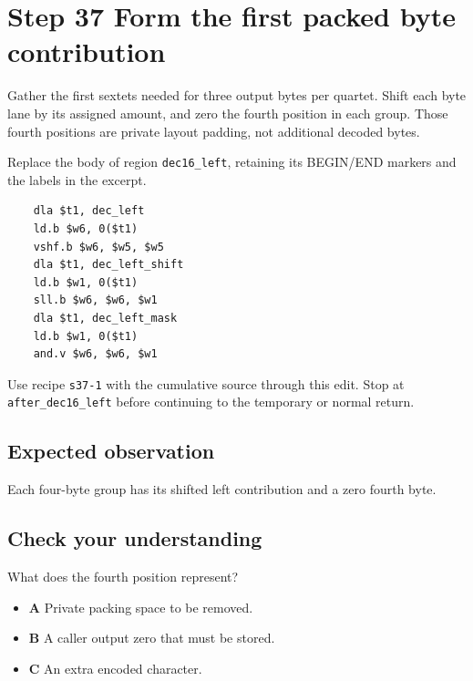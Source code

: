 \section{Step 37 Form the first packed byte contribution}\label{base64-s37}

Gather the first sextets needed for three output bytes per quartet. Shift each byte lane by its assigned amount, and zero the fourth position in each group. Those fourth positions are private layout padding, not additional decoded bytes.

Replace the body of region \texttt{dec16\_left}, retaining its BEGIN/END markers and the labels in the excerpt.

\begin{verbatim}
    dla $t1, dec_left
    ld.b $w6, 0($t1)
    vshf.b $w6, $w5, $w5
    dla $t1, dec_left_shift
    ld.b $w1, 0($t1)
    sll.b $w6, $w6, $w1
    dla $t1, dec_left_mask
    ld.b $w1, 0($t1)
    and.v $w6, $w6, $w1
\end{verbatim}

Use recipe \texttt{s37-1} with the cumulative source through this edit. Stop at \texttt{after\_dec16\_left} before continuing to the temporary or normal return.

\subsection{Expected observation}
Each four-byte group has its shifted left contribution and a zero fourth byte.

\subsection{Check your understanding}
What does the fourth position represent?

\begin{itemize}
  \item \textbf{A} Private packing space to be removed.
  \item \textbf{B} A caller output zero that must be stored.
  \item \textbf{C} An extra encoded character.
\end{itemize}
